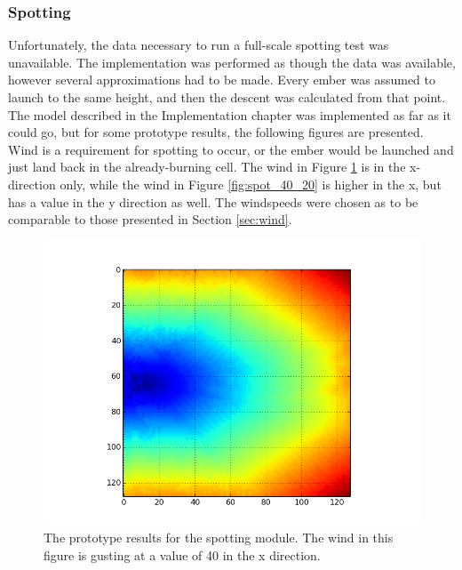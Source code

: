 \subsubsection{Spotting}
Unfortunately, the data necessary to run a full-scale spotting test was unavailable. The implementation was performed as though the data was available, however several approximations had to be made. Every ember was assumed to launch to the same height, and then the descent was calculated from that point. The model described in the Implementation chapter was implemented as far as it could go, but for some prototype results, the following figures are presented. Wind is a requirement for spotting to occur, or the ember would be launched and just land back in the already-burning cell. The wind in Figure \ref{fig:spot_40} is in the x-direction only, while the wind in Figure \ref{fig:spot_40_20} is higher in the x, but has a value in the y direction as well. The windspeeds were chosen as to be comparable to those presented in Section \ref{sec:wind}.
\begin{figure}%
\centering
  \includegraphics[height=.38\textheight]{figures/results/spot_40.png}
  \caption{The prototype results for the spotting module. The wind in this figure is gusting at a value of 40 in the x direction.}
  \label{fig:spot_40}
\end{figure}  
